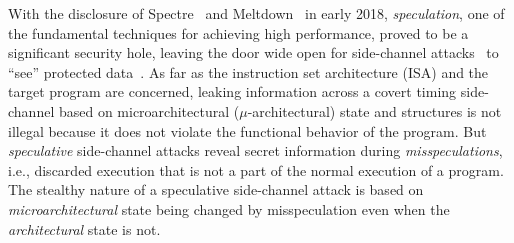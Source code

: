 


With the disclosure of Spectre~\cite{kocher_spectre_2018} and Meltdown~\cite{lipp_meltdown_2018} in early 2018, \emph{speculation}, one of the fundamental techniques for achieving high
performance, proved to be a significant security hole, leaving the door wide
open for side-channel attacks~\cite{bernstein2005cache,yarom_flush+_2014,liu15llc,irazoqui_cross_2016} to ``see'' protected data~\cite{kocher_spectre_2018,lipp_meltdown_2018}.
As far as the instruction set architecture (ISA) and the target program are
concerned, leaking information across a covert timing side-channel based on microarchitectural ($\mu$-architectural) state and structures is not illegal
because it does not violate the functional behavior of the program.
But \emph{speculative} side-channel attacks reveal secret information during \emph{misspeculations}, 
i.e., discarded execution that is not a part of the normal execution of a program.
The stealthy nature of a speculative side-channel attack is based on
\emph{microarchitectural} state being changed by misspeculation even when the \emph{architectural}
state is not.

